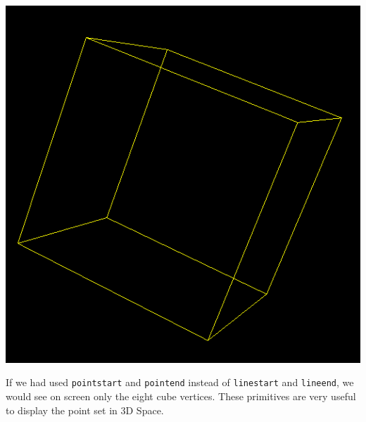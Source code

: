\begin{center}
\includegraphics*[scale=0.4]{pics/3dCube2.png}
\end{center}
If we had used \texttt{pointstart} and \texttt{pointend} instead of \texttt{linestart} and \texttt{lineend}, we would see on screen only the eight cube vertices. These primitives are very useful to display the point set in 3D Space.
